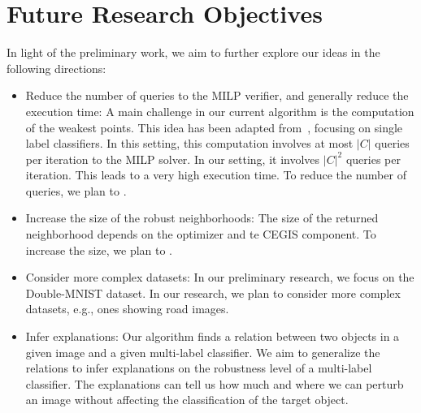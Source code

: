 
\section{Future Research Objectives}
In light of the preliminary work, we aim to further explore our ideas in the following directions:
\begin{itemize}
    \item Reduce the number of queries to the MILP verifier, and generally reduce the execution time:
            A main challenge in our current algorithm is the computation of the weakest points. This idea has been adapted from~\cite{MARVEL}, focusing on single label classifiers. In this setting, this computation involves 
    at most $|C|$ queries per iteration to the MILP solver. In our setting, it involves  $|C|^2$ queries per iteration. This leads to a very high execution time. To reduce the number of queries, we plan to .
    \item Increase the size of the robust neighborhoods: The size of the returned neighborhood depends on the optimizer and te CEGIS component. To increase the size, we plan to .
\item Consider more complex datasets: In our preliminary research, we focus on the Double-MNIST dataset. In our research, we plan to consider more complex datasets, e.g., ones showing road images. 
    \item Infer explanations: Our algorithm finds a relation between two objects in a given image and a given multi-label classifier.
    We aim to generalize the relations to infer explanations on the robustness level of a multi-label classifier. The explanations can tell us how much and where we can perturb an image without affecting the classification of the target object. 
\end{itemize}
